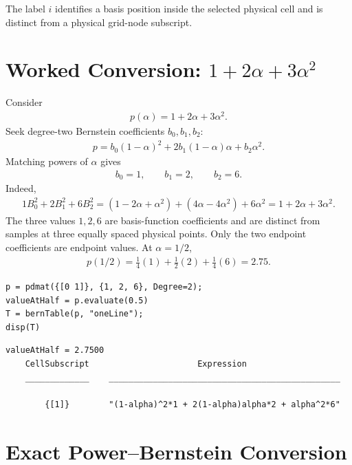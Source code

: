 The label $i$ identifies a basis position inside the selected physical cell and is distinct from a physical grid-node subscript.

\section{Worked Conversion: \texorpdfstring{$1+2\alpha+3\alpha^2$}
{1+2 alpha+3 alpha squared}}
\label{sec:bernstein-power-conversion}

Consider
\begin{gather*}
p(\alpha)=1+2\alpha+3\alpha^2.
\end{gather*}
Seek degree-two Bernstein coefficients $b_0,b_1,b_2$:
\begin{gather*}
p=b_0(1-\alpha)^2+2b_1(1-\alpha)\alpha+b_2\alpha^2.
\end{gather*}
Matching powers of $\alpha$ gives
\begin{gather*}
b_0=1,\qquad b_1=2,\qquad b_2=6.
\end{gather*}
Indeed,
\begin{gather*}
1B_0^2+2B_1^2+6B_2^2 =(1-2\alpha+\alpha^2)+(4\alpha-4\alpha^2)+6\alpha^2 =1+2\alpha+3\alpha^2.
\end{gather*}
The three values $1,2,6$ are basis-function coefficients and are distinct from samples at three equally spaced physical points. Only the two endpoint coefficients are endpoint values. At $\alpha=1/2$,
\begin{gather*}
p(1/2)=\tfrac14(1)+\tfrac12(2)+\tfrac14(6)=2.75.
\end{gather*}
\shortpairspace
\begin{lstlisting}[style=dpmatlab]
p = pdmat({[0 1]}, {1, 2, 6}, Degree=2);
valueAtHalf = p.evaluate(0.5)
T = bernTable(p, "oneLine");
disp(T)
\end{lstlisting}

\begin{lstlisting}[style=dpoutput]
valueAtHalf = 2.7500
    CellSubscript                      Expression
    _____________    _______________________________________________

        {[1]}        "(1-alpha)^2*1 + 2(1-alpha)alpha*2 + alpha^2*6"
\end{lstlisting}

\section{Exact Power--Bernstein Conversion}


